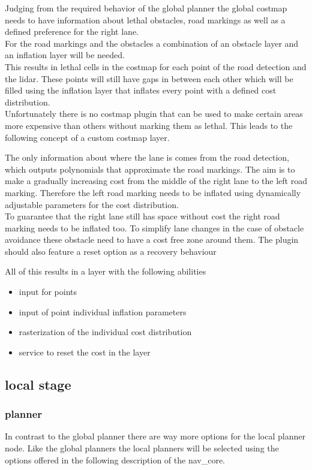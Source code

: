 Judging from the required behavior of the global planner the global costmap needs to have information about lethal obstacles, road markings as well as a defined preference for the right lane.\\

For the road markings and the obstacles a combination of an obstacle layer and an inflation layer will be needed.\\
This results in lethal cells in the costmap for each point of the road detection and the lidar. These points will still have gaps in between each other which will be filled using the inflation layer that inflates every point with a defined cost distribution.\\

Unfortunately there is no costmap plugin that can be used to make certain areas more expensive than others without marking them as lethal. This leads to the following concept of a custom costmap layer.

The only information about where the lane is comes from the road detection, which outputs polynomials that approximate the road markings. The aim is to make a gradually increasing cost from the middle of the right lane to the left road marking. Therefore the left road marking needs to be inflated using dynamically adjustable parameters for the cost distribution.\\
To guarantee that the right lane still has space without cost the right road marking needs to be inflated too. To simplify lane changes in the case of obstacle avoidance these obstacle need to have a cost free zone around them.
The plugin should also feature a reset option as a recovery behaviour

All of this results in a layer with the following abilities

\begin{itemize}
	\item input for points
	\item input of point individual inflation parameters
	\item rasterization of the individual cost distribution
	\item service to reset the cost in the layer
\end{itemize}

\subsection{local stage}
\subsubsection{planner}
In contrast to the global planner there are way more options for the local planner node. Like the global planners the local planners will be selected using the options offered in the following description of the nav\_core.

